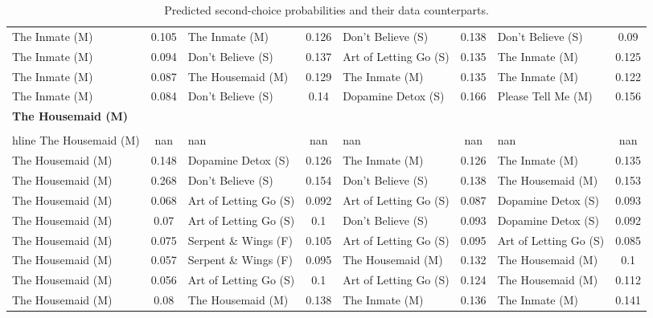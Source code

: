 \begin{table}[h]
\begin{tabular}{l c | l c | l c | l c}
The Inmate (M) & 0.105 & The Inmate (M) & 0.126 & Don't Believe (S) & 0.138 & Don't Believe (S) & 0.09 \\ 
The Inmate (M) & 0.094 & Don't Believe (S) & 0.137 & Art of Letting Go (S) & 0.135 & The Inmate (M) & 0.125 \\ 
The Inmate (M) & 0.087 & The Housemaid (M) & 0.129 & The Inmate (M) & 0.135 & The Inmate (M) & 0.122 \\ 
The Inmate (M) & 0.084 & Don't Believe (S) & 0.14 & Dopamine Detox (S) & 0.166 & Please Tell Me (M) & 0.156 \\ 
\hline
\multicolumn{8}{l}{\textbf{The Housemaid (M)}} \\ \\hline
The Housemaid (M) & nan & nan & nan & nan & nan & nan & nan \\ 
The Housemaid (M) & 0.148 & Dopamine Detox (S) & 0.126 & The Inmate (M) & 0.126 & The Inmate (M) & 0.135 \\ 
The Housemaid (M) & 0.268 & Don't Believe (S) & 0.154 & Don't Believe (S) & 0.138 & The Housemaid (M) & 0.153 \\ 
The Housemaid (M) & 0.068 & Art of Letting Go (S) & 0.092 & Art of Letting Go (S) & 0.087 & Dopamine Detox (S) & 0.093 \\ 
The Housemaid (M) & 0.07 & Art of Letting Go (S) & 0.1 & Don't Believe (S) & 0.093 & Dopamine Detox (S) & 0.092 \\ 
The Housemaid (M) & 0.075 & Serpent \& Wings (F) & 0.105 & Art of Letting Go (S) & 0.095 & Art of Letting Go (S) & 0.085 \\ 
The Housemaid (M) & 0.057 & Serpent \& Wings (F) & 0.095 & The Housemaid (M) & 0.132 & The Housemaid (M) & 0.1 \\ 
The Housemaid (M) & 0.056 & Art of Letting Go (S) & 0.1 & Art of Letting Go (S) & 0.124 & The Housemaid (M) & 0.112 \\ 
The Housemaid (M) & 0.08 & The Housemaid (M) & 0.138 & The Inmate (M) & 0.136 & The Inmate (M) & 0.141 \\ 
\hline

\end{tabular}
\caption{Predicted second-choice probabilities and their data counterparts.}
\label{tab:implied_substitutes}
\end{table}
